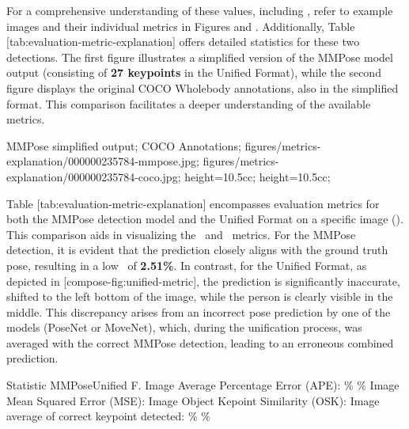 For a comprehensive understanding of these values, including \MSE, refer to example images and their individual metrics in Figures  and . Additionally, Table [tab:evaluation-metric-explanation] offers detailed statistics for these two detections. The first figure illustrates a simplified version of the MMPose model output (consisting of {\bf 27 keypoints} in the Unified Format), while the second figure displays the original COCO Wholebody annotations, also in the simplified format. This comparison facilitates a deeper understanding of the available metrics.

    {
        MMPose simplified output;
        COCO Annotations;
    }
    {
        figures/metrics-explanation/000000235784-mmpose.jpg;
        figures/metrics-explanation/000000235784-coco.jpg;
    }
    {
        height=10.5cc;
        height=10.5cc;
    }


Table [tab:evaluation-metric-explanation] encompasses evaluation metrics for both the MMPose detection model and the Unified Format on a specific image (). This comparison aids in visualizing the \APE\ and \MSE\ metrics. For the MMPose detection, it is evident that the prediction closely aligns with the ground truth pose, resulting in a low \APE\ of {\bf 2.51\%}. In contrast, for the Unified Format, as depicted in [compose-fig:unified-metric], the prediction is significantly inaccurate, shifted to the left bottom of the image, while the person is clearly visible in the middle. This discrepancy arises from an incorrect pose prediction by one of the models (PoseNet or MoveNet), which, during the unification process, was averaged with the correct MMPose detection, leading to an erroneous combined prediction.

    \setupTABLE[r][1][style=bold]
    \setupTABLE[c][each][offset=3dd]
    \setupTABLE[frame=off]
    \setupTABLE[r][1][topframe=on,bottomframe=on]
    \setupTABLE[c][each][leftframe=on]
    \setupTABLE[c][1][leftframe=off]
    \setupTABLE[c][2,3][align=middle]
    \bTR\bTD Statistic                                   \eTD\bTD    MMPose\eTD\bTD     Unified F.\eTD\eTR
    \bTR\bTD Image Average Percentage Error (APE):       \eTD{}\% \eTD{}\% \eTD\eTR
    \bTR\bTD Image Mean Squared Error (MSE):             \eTD{} \eTD{} \eTD\eTR
    \bTR\bTD Image Object Kepoint Similarity (OSK):      \eTD{} \eTD{} \eTD\eTR
    \bTR\bTD Image average of correct keypoint detected: \eTD{}\% \eTD{}\% \eTD\eTR

